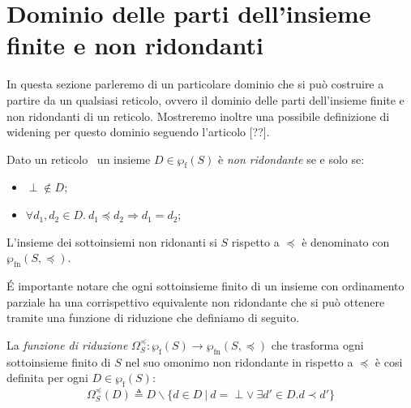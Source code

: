 \section{Dominio delle parti dell'insieme finite e non ridondanti}\label{sec:EgliMilnerWidening}
In questa sezione parleremo di un particolare dominio che si può costruire a partire da un qualsiasi reticolo, ovvero il dominio delle parti dell'insieme finite e non ridondanti di un reticolo. Mostreremo inoltre una possibile definizione di widening per questo dominio seguendo l'articolo [??].

\begin{definition}
Dato un reticolo \ un insieme \(D\in\wp_{\textrm{f}} (S)\) è \textit{non ridondante} se e solo se:
\begin{itemize}
	\item \(\perp\notin D\);
	\item \(\forall d_1, d_2 \in D.\ d_1\preceq d_2\Rightarrow d_1=d_2\);
\end{itemize}
L'insieme dei sottoinsiemi non ridonanti si \(S\) rispetto a \(\preceq\) è denominato con \(\wp_{\textrm{fn}}(S, \preceq)\).
\end{definition}

\'E importante notare che ogni sottoinsieme finito di un insieme con ordinamento parziale ha una corrispettivo equivalente non ridondante che si può ottenere tramite una funzione di riduzione che definiamo di seguito.

\begin{definition}\label{def:funzioneRiduzione}
La \textit{funzione di riduzione} \(\Omega_{S}^{\preceq} : \wp_{\textrm{f}}(S)\rightarrow\wp_{\textrm{fn}}(S, \preceq)\) che trasforma ogni sottoinsieme finito di \(S\) nel suo omonimo non ridondante in rispetto a \(\preceq\) è cosi definita per ogni \(D\in\wp_{\textrm{f}}(S)\):
\[\Omega_{S}^{\preceq}(D) \triangleq D \backslash \lbrace d \in D     \ \vert\ d= \perp \vee\ \exists d'\in D . d\prec d' \rbrace\]
\end{definition}

